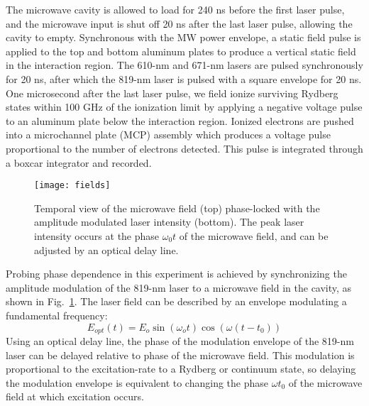 \documentclass[aps,pra,preprint,groupedaddress]{revtex4-1}
\begin{document}

The microwave cavity is allowed to load for 240 ns before the first laser pulse, and the microwave input is shut off 20 ns after the last laser pulse, allowing the cavity to empty. Synchronous with the MW power envelope, a static field pulse is applied to the top and bottom aluminum plates to produce a vertical static field in the interaction region. The 610-nm and 671-nm lasers are pulsed synchronously for 20 ns, after which the 819-nm laser is pulsed with a square envelope for 20 ns. One microsecond after the last laser pulse, we field ionize surviving Rydberg states within 100 GHz of the ionization limit by applying a negative voltage pulse to an aluminum plate below the interaction region. Ionized electrons are pushed into a microchannel plate (MCP) assembly which produces a voltage pulse proportional to the number of electrons detected. This pulse is integrated through a boxcar integrator and recorded.

\begin{figure}
	\texttt{[image: fields]}
	\caption{Temporal view of the microwave field (top) phase-locked with the amplitude modulated laser intensity (bottom). The peak laser intensity occurs at the phase $\omega_0 t$ of the microwave field, and can be adjusted by an optical delay line.}
	\label{fig:AMLaser}
\end{figure}

Probing phase dependence in this experiment is achieved by synchronizing the amplitude modulation of the 819-nm laser to a microwave field in the cavity, as shown in Fig.~\ref{fig:AMLaser}. The laser field can be described by an envelope modulating a fundamental frequency:
\begin{equation}
E_{opt}(t) = E_o \sin{(\omega_o t)} \cos{(\omega(t-t_0))}
\end{equation}
Using an optical delay line, the phase of the modulation envelope of the 819-nm laser can be delayed relative to phase of the microwave field. This modulation is proportional to the excitation-rate to a Rydberg or continuum state, so delaying the modulation envelope is equivalent to changing the phase $\omega t_0$ of the microwave field at which excitation occurs.
\end{document}
